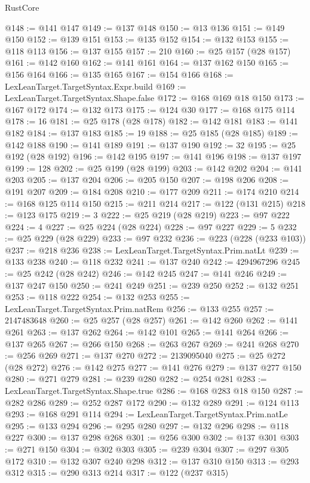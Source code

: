 \begin{lexlean}{RustCore}
\begin{coremodule}
@148 := @141 @147
@149 := @137 @148
@150 := @13 @136
@151 := @149 @150
@152 := @139 @151
@153 := @135 @152
@154 := @132 @153
@155 := @118 @113
@156 := @137 @155
@157 := 210
@160 := @25 @157 (@28 @157)
@161 := @142 @160
@162 := @141 @161
@164 := @137 @162 @150
@165 := @156 @164
@166 := @135 @165
@167 := @154 @166
@168 := LexLeanTarget.TargetSyntax.Expr.build
@169 := LexLeanTarget.TargetSyntax.Shape.false
@172 := @168 @169 @18 @150
@173 := @167 @172
@174 := @132 @173
@175 := @124 @30
@177 := @168 @175 @114
@178 := 16
@181 := @25 @178 (@28 @178)
@182 := @142 @181
@183 := @141 @182
@184 := @137 @183
@185 := 19
@188 := @25 @185 (@28 @185)
@189 := @142 @188
@190 := @141 @189
@191 := @137 @190
@192 := 32
@195 := @25 @192 (@28 @192)
@196 := @142 @195
@197 := @141 @196
@198 := @137 @197
@199 := 128
@202 := @25 @199 (@28 @199)
@203 := @142 @202
@204 := @141 @203
@205 := @137 @204
@206 := @205 @150
@207 := @198 @206
@208 := @191 @207
@209 := @184 @208
@210 := @177 @209
@211 := @174 @210
@214 := @168 @125 @114 @150
@215 := @211 @214
@217 := @122 (@131 @215)
@218 := @123 @175
@219 := 3
@222 := @25 @219 (@28 @219)
@223 := @97 @222
@224 := 4
@227 := @25 @224 (@28 @224)
@228 := @97 @227
@229 := 5
@232 := @25 @229 (@28 @229)
@233 := @97 @232
@236 := @223 (@228 (@233 @103))
@237 := @218 @236
@238 := LexLeanTarget.TargetSyntax.Prim.natLt
@239 := @133 @238
@240 := @118 @232
@241 := @137 @240
@242 := 4294967296
@245 := @25 @242 (@28 @242)
@246 := @142 @245
@247 := @141 @246
@249 := @137 @247 @150
@250 := @241 @249
@251 := @239 @250
@252 := @132 @251
@253 := @118 @222
@254 := @132 @253
@255 := LexLeanTarget.TargetSyntax.Prim.natRem
@256 := @133 @255
@257 := 2147483648
@260 := @25 @257 (@28 @257)
@261 := @142 @260
@262 := @141 @261
@263 := @137 @262
@264 := @142 @101
@265 := @141 @264
@266 := @137 @265
@267 := @266 @150
@268 := @263 @267
@269 := @241 @268
@270 := @256 @269
@271 := @137 @270
@272 := 2139095040
@275 := @25 @272 (@28 @272)
@276 := @142 @275
@277 := @141 @276
@279 := @137 @277 @150
@280 := @271 @279
@281 := @239 @280
@282 := @254 @281
@283 := LexLeanTarget.TargetSyntax.Shape.true
@286 := @168 @283 @18 @150
@287 := @282 @286
@289 := @252 @287 @172
@290 := @132 @289
@291 := @124 @113
@293 := @168 @291 @114
@294 := LexLeanTarget.TargetSyntax.Prim.natLe
@295 := @133 @294
@296 := @295 @280
@297 := @132 @296
@298 := @118 @227
@300 := @137 @298 @268
@301 := @256 @300
@302 := @137 @301
@303 := @271 @150
@304 := @302 @303
@305 := @239 @304
@307 := @297 @305 @172
@310 := @132 @307 @240 @298
@312 := @137 @310 @150
@313 := @293 @312
@315 := @290 @313 @214
@317 := @122 (@237 @315)

\end{coremodule}
\end{lexlean}
